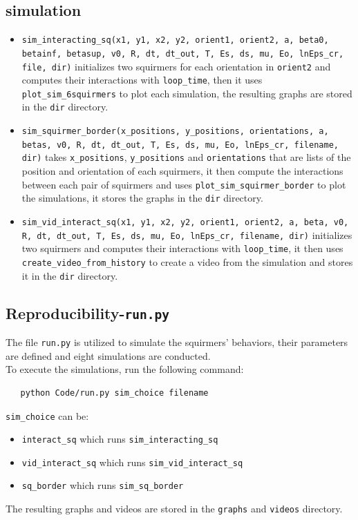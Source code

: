 \documentclass{article}
\begin{document}
\subsection{simulation}
\begin{itemize}
   \item \texttt{sim\_interacting\_sq(x1, y1, x2, y2, orient1, orient2, a, beta0, betainf, betasup, v0,  R, dt, dt\_out, T, Es, ds, mu, Eo, lnEps\_cr, file, dir)}
   initializes two squirmers for each orientation in \texttt{orient2} and computes their 
   interactions with \texttt{loop\_time}, then it uses \texttt{plot\_sim\_6squirmers} to plot each simulation, the resulting
    graphs are stored in the \texttt{dir} directory.
   \item \texttt{sim\_squirmer\_border(x\_positions, y\_positions, orientations, a, betas, v0, R, dt, dt\_out, T, Es, ds, mu, Eo, lnEps\_cr, filename, dir)}
   takes \texttt{x\_positions}, \texttt{y\_positions} and \texttt{orientations} that are lists of the position and orientation of each squirmers,
    it then compute the interactions between each pair of squirmers and uses \texttt{plot\_sim\_squirmer\_border} to plot the
    simulations, it stores the graphs in the \texttt{dir} directory.
   \item \texttt{sim\_vid\_interact\_sq(x1, y1, x2, y2, orient1, orient2, a, beta, v0, R, dt, dt\_out, T, Es, ds, mu, Eo, lnEps\_cr, filename, dir)}
   initializes two squirmers and computes their interactions with \texttt{loop\_time}, it then uses \texttt{create\_video\_from\_history}
    to create a video from the simulation and stores it in the \texttt{dir} directory.
\end{itemize}

\subsection{Reproducibility-\texttt{run.py}}
The file \texttt{run.py} is utilized to simulate the squirmers' behaviors, their parameters are defined
 and eight simulations are conducted.\\
 To execute the simulations, run the following command:
 \begin{verbatim}
   python Code/run.py sim_choice filename
\end{verbatim} 
\texttt{sim\_choice} can be:
\begin{itemize}
   \item \texttt{interact\_sq} which runs \texttt{sim\_interacting\_sq}
   \item \texttt{vid\_interact\_sq} which runs \texttt{sim\_vid\_interact\_sq}
   \item \texttt{sq\_border} which runs \texttt{sim\_sq\_border}
\end{itemize}
 The resulting graphs and videos are stored in the 
 \texttt{graphs} and \texttt{videos} directory.
\end{document}

